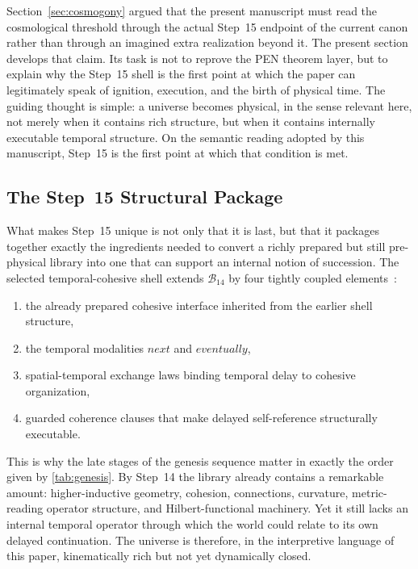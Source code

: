 \documentclass[11pt,a4paper]{article}
\def\bigcirc{next}%
\def\Diamond{eventually}%
\theoremstyle{plain}
\theoremstyle{definition}
\theoremstyle{remark}
\newcommand{\B}{\mathcal{B}}
\newcommand{\nextmod}{\bigcirc}
\newcommand{\eventually}{\Diamond}
\begin{document}
Section~\ref{sec:cosmogony} argued that the present manuscript must read the cosmological threshold through the actual Step~15 endpoint of the current canon rather than through an imagined extra realization beyond it.
The present section develops that claim.
Its task is not to reprove the PEN theorem layer, but to explain why the Step~15 shell is the first point at which the paper can legitimately speak of ignition, execution, and the birth of physical time.
The guiding thought is simple: a universe becomes physical, in the sense relevant here, not merely when it contains rich structure, but when it contains internally executable temporal structure.
On the semantic reading adopted by this manuscript, Step~15 is the first point at which that condition is met.

\subsection{The Step~15 Structural Package}
\label{subsec:step15-package}

What makes Step~15 unique is not only that it is last, but that it packages together exactly the ingredients needed to convert a richly prepared but still pre-physical library into one that can support an internal notion of succession.
The selected temporal-cohesive shell extends $\B_{14}$ by four tightly coupled elements~\cite{pen,abb}:
\begin{enumerate}[nosep]
    \item the already prepared cohesive interface inherited from the earlier shell structure,
    \item the temporal modalities $\nextmod$ and $\eventually$,
    \item spatial-temporal exchange laws binding temporal delay to cohesive organization,
    \item guarded coherence clauses that make delayed self-reference structurally executable.
\end{enumerate}

This is why the late stages of the genesis sequence matter in exactly the order given by \cref{tab:genesis}.
By Step~14 the library already contains a remarkable amount: higher-inductive geometry, cohesion, connections, curvature, metric-reading operator structure, and Hilbert-functional machinery.
Yet it still lacks an internal temporal operator through which the world could relate to its own delayed continuation.
The universe is therefore, in the interpretive language of this paper, kinematically rich but not yet dynamically closed.
\end{document}
